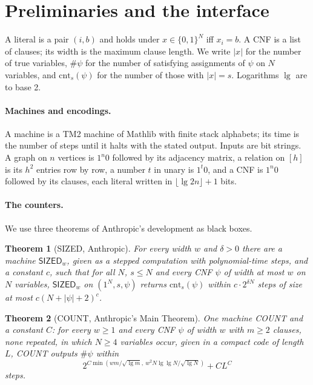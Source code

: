 \documentclass[11pt]{article}
\newtheorem{theorem}{Theorem}
\theoremstyle{remark}
\newcommand{\SIZED}{\textsf{SIZED}}
\newcommand{\COUNT}{\textsf{COUNT}}
\newcommand{\cnt}{\mathrm{cnt}}
\begin{document}
\section{Preliminaries and the interface}\label{sec:prelim}

A literal is a pair $(i,b)$ and holds under $x\in\{0,1\}^N$ iff $x_i=b$. A CNF is a list of clauses;
its width is the maximum clause length. We write $|x|$ for the number of true variables,
$\#\psi$ for the number of satisfying assignments of $\psi$ on $N$ variables, and $\cnt_s(\psi)$ for
the number of those with $|x|=s$. Logarithms $\lg$ are to base 2.

\paragraph{Machines and encodings.} A machine is a TM2 machine of Mathlib with finite stack
alphabets; its time is the number of steps until it halts with the stated output. Inputs are bit
strings. A graph on $n$ vertices is $1^n0$ followed by its adjacency matrix, a relation on $[h]$ is
its $h^2$ entries row by row, a number $t$ in unary is $1^t0$, and a CNF is $1^n0$ followed by its
clauses, each literal written in $\lfloor\lg 2n\rfloor+1$ bits.

\paragraph{The counters.} We use three theorems of Anthropic's development as black boxes.

\begin{theorem}[\SIZED{}, Anthropic]\label{thm:sized}
For every width $w$ and $\delta>0$ there are a machine $\SIZED_w$, given as a stepped computation
with polynomial-time steps, and a constant $c$, such that for all $N$, $s\le N$ and every CNF $\psi$
of width at most $w$ on $N$ variables, $\SIZED_w$ on $(1^N,s,\psi)$ returns $\cnt_s(\psi)$ within
$c\cdot2^{\delta N}$ steps of size at most $c(N+|\psi|+2)^c$.
\end{theorem}

\begin{theorem}[\COUNT{}, Anthropic's Main Theorem]\label{thm:count}
One machine \COUNT{} and a constant $C$: for every $w\ge1$ and every CNF $\psi$ of width $w$ with
$m\ge2$ clauses, none repeated, in which $N\ge4$ variables occur, given in a compact code of length $L$, \COUNT{}
outputs $\#\psi$ within
\[2^{C\min(wm/\sqrt{\lg m},\ w^2N\lg\lg N/\sqrt{\lg N})}+CL^C\]
steps.
\end{theorem}
\end{document}

